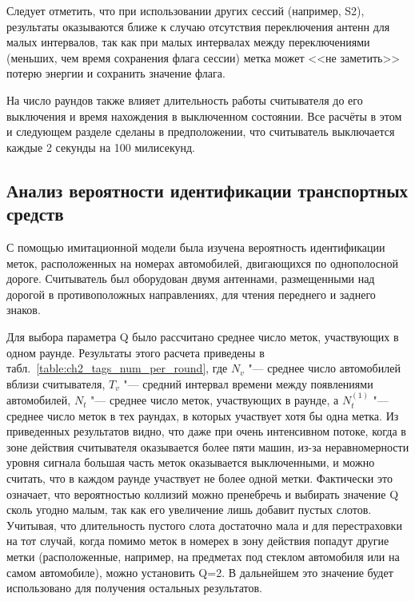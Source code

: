 Следует отметить, что при использовании других сессий (например, S2), результаты оказываются ближе к случаю отсутствия переключения антенн для малых интервалов, так как при малых интервалах между переключениями (меньших, чем время сохранения флага сессии) метка может <<не заметить>> потерю энергии и сохранить значение флага.

На число раундов также влияет длительность работы считывателя до его выключения и время нахождения в выключенном состоянии. Все расчёты в этом и следующем разделе сделаны в предположении, что считыватель выключается каждые 2 секунды на 100 милисекунд.



\subsection{Анализ вероятности идентификации транспортных средств}
С помощью имитационной модели была изучена вероятность идентификации меток, расположенных на номерах автомобилей, двигающихся по однополосной дороге. Считыватель был оборудован двумя антеннами, размещенными над дорогой в противоположных направлениях, для чтения переднего и заднего знаков. 

Для выбора параметра Q было рассчитано среднее число меток, участвующих в одном раунде. Результаты этого расчета приведены в табл.~\ref{table:ch2_tags_num_per_round}, где $N_v$ "--- среднее число автомобилей вблизи считывателя, $T_v$ "--- средний интервал времени между появлениями автомобилей, $N_t$ "--- среднее число меток, участвующих в раунде, а $N_t^{(1)}$ "--- среднее число меток в тех раундах, в которых участвует хотя бы одна метка. Из приведенных результатов видно, что даже при очень интенсивном потоке, когда в зоне действия считывателя оказывается более пяти машин, из-за неравномерности уровня сигнала большая часть меток оказывается выключенными, и можно считать, что в каждом раунде участвует не более одной метки. Фактически это означает, что вероятностью коллизий можно пренебречь и выбирать значение Q сколь угодно малым, так как его увеличение лишь добавит пустых слотов. Учитывая, что длительность пустого слота достаточно мала и для перестраховки на тот случай, когда помимо меток в номерех в зону действия попадут  другие метки (расположенные, например, на предметах под стеклом автомобиля или на самом автомобиле), можно установить Q=2. В дальнейшем это значение будет использовано для получения остальных результатов.

